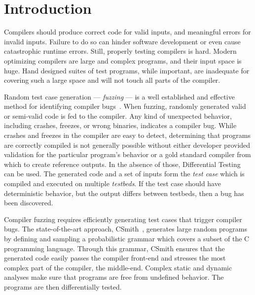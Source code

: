 \section{Introduction}\label{sec:intro}

\noindent
Compilers should produce correct code for valid inputs, and meaningful errors for invalid inputs. Failure to do so can hinder software development or even cause catastrophic runtime errors. Still, properly testing compilers is hard. Modern optimizing compilers are large and complex programs, and their input space is huge. Hand designed suites of test programs, while important, are inadequate for covering such a large space and will not touch all parts of the compiler.


Random test case generation --- \emph{fuzzing} --- is a well established and effective method for identifying compiler bugs~\cite{Chen2014a,Chen2013,Kossatchev2005}. When fuzzing, randomly generated valid or semi-valid code is fed to the compiler. Any kind of unexpected behavior, including crashes, freezes, or wrong binaries, indicates a compiler bug. While crashes and freezes in the compiler are easy to detect, determining that programs are correctly compiled is not generally possible without either developer provided validation for the particular program's behavior or a gold standard compiler from which to create reference outputs. In the absence of those, Differential Testing~\cite{McKeeman1998} can be used. The generated code and a set of inputs form the \emph{test case} which is compiled and executed on multiple \emph{testbeds}. If the test case should have deterministic behavior, but the output differs between testbeds, then a bug has been discovered.

Compiler fuzzing requires efficiently generating test cases that trigger compiler bugs. The state-of-the-art approach, CSmith~\cite{Yang2011}, generates large random programs by defining and sampling a probabilistic grammar which covers a subset of the C programming language. Through this grammar, CSmith ensures that the generated code easily passes the compiler front-end and stresses the most complex part of the compiler, the middle-end.  Complex static and dynamic analyses make sure that programs are free from undefined behavior. The programs are then differentially tested.

